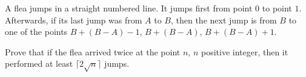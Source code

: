 A flea jumps in a straight numbered line. It jumps first from point $0$ to point $1$. Afterwards, if its last jump was from $A$ to $B$,  then the next jump is from $B$ to one of the points $B + (B - A) - 1$,  $B + (B - A)$,  $B + (B-A) + 1$.

Prove that if the flea arrived twice at the point $n$,  $n$ positive integer, then it performed at least $\lceil 2\sqrt n\rceil$ jumps.